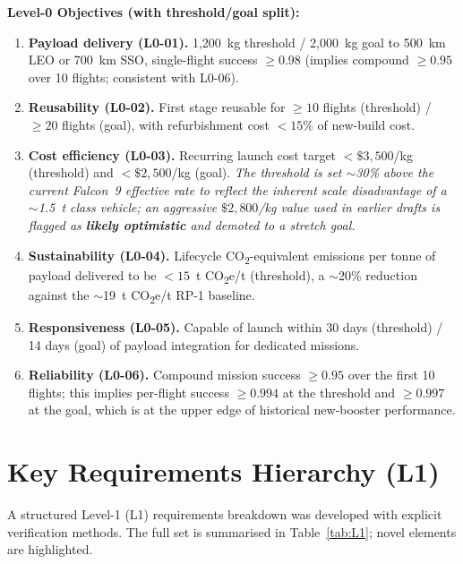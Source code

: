 \documentclass[10pt,a4paper]{article}
\begin{document}
\textbf{Level-0 Objectives (with threshold/goal split):}
\begin{enumerate}[leftmargin=*]
    \item \textbf{Payload delivery (L0-01).} 1,200~kg threshold / 2,000~kg goal to 500~km LEO or 700~km SSO, single-flight success $\geq 0.98$ (implies compound $\geq 0.95$ over 10 flights; consistent with L0-06).
    \item \textbf{Reusability (L0-02).} First stage reusable for $\geq 10$ flights (threshold) / $\geq 20$ flights (goal), with refurbishment cost $< 15\%$ of new-build cost.
    \item \textbf{Cost efficiency (L0-03).} Recurring launch cost target $< \$3{,}500$/kg (threshold) and $< \$2{,}500$/kg (goal). \textit{The threshold is set $\sim$30\% above the current Falcon~9 effective rate to reflect the inherent scale disadvantage of a $\sim$1.5~t class vehicle; an aggressive $\$2{,}800$/kg value used in earlier drafts is flagged as \textbf{likely optimistic} and demoted to a stretch goal.}
    \item \textbf{Sustainability (L0-04).} Lifecycle CO\textsubscript{2}-equivalent emissions per tonne of payload delivered to be $< 15$~t CO\textsubscript{2}e/t (threshold), a $\sim$20\% reduction against the $\sim$19~t CO\textsubscript{2}e/t RP-1 baseline.
    \item \textbf{Responsiveness (L0-05).} Capable of launch within 30 days (threshold) / 14 days (goal) of payload integration for dedicated missions.
    \item \textbf{Reliability (L0-06).} Compound mission success $\geq 0.95$ over the first 10 flights; this implies per-flight success $\geq 0.994$ at the threshold and $\geq 0.997$ at the goal, which is at the upper edge of historical new-booster performance.
\end{enumerate}

\section{Key Requirements Hierarchy (L1)}
A structured Level-1 (L1) requirements breakdown was developed with explicit verification methods. The full set is summarised in Table~\ref{tab:L1}; novel elements are highlighted.
\end{document}
